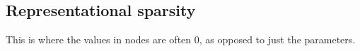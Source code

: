 
\subsection{Representational sparsity}

This is where the values in nodes are often \(0\), as opposed to just the parameters.

